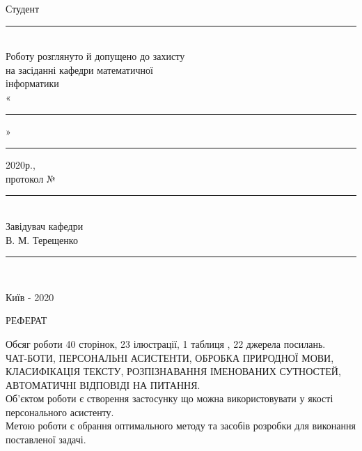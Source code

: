 \begin{SingleSpacing}
\begin{flushright}
\begin{minipage}{.52\linewidth}
   Студент \hfill \rule{4cm}{1pt}  \vspace{0.3cm}  \\
   Роботу розглянуто й допущено до захисту \\
   на засіданні кафедри математичної \\
   інформатики \\
   «\rule{1cm}{1pt}» \rule{4cm}{1pt} 2020р., \\
   протокол № \rule{2cm}{1pt} \\
   Завідувач кафедри \\
   В. М. Терещенко \hfill \rule{4cm}{1pt} \\

  \end{minipage}
 \end{flushright}
 \vspace{4mm}

 \begin{center}
  Київ - 2020
 \end{center}
\end{SingleSpacing}
\newpage
\begin{center}
    РЕФЕРАТ
\end{center}
Обсяг роботи 40 сторінок, 23 ілюстрації, 1 таблиця , 22 джерела посилань. 
\\
ЧАТ-БОТИ, ПЕРСОНАЛЬНІ АСИСТЕНТИ, ОБРОБКА ПРИРОДНОЇ МОВИ, КЛАСИФІКАЦІЯ ТЕКСТУ, РОЗПІЗНАВАННЯ ІМЕНОВАНИХ СУТНОСТЕЙ, АВТОМАТИЧНІ ВІДПОВІДІ НА ПИТАННЯ. 
\\
Об’єктом роботи є створення застосунку що можна використовувати у якості персонального асистенту.
\\
Метою роботи є обрання оптимального методу та засобів розробки для виконання поставленої задачі. 

